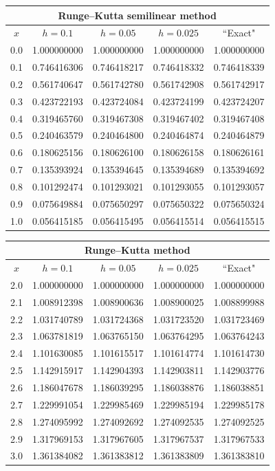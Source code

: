 \documentclass[dvips]{book}
\renewcommand{\exer}[1]{\par\medskip\;\noindent{\color{red}\bf #1.}}
\numberwithin{example}{section}
\numberwithin{equation}{section}
\numberwithin{theorem}{section}
\numberwithin{table}{section}
\numberwithin{figure}{section}
\begin{document}
{\small
\begin{tabular}{|c|r|r|r|r|}
\hline
\multicolumn{5}{|c|}{
 Runge--Kutta  semilinear method}\\\hline
\multicolumn{1}{|c|}{$x$}&
\multicolumn{1}{|c|}{$h=0.1$}&
\multicolumn{1}{|c|}{$h=0.05$}&
\multicolumn{1}{|c|}{$h=0.025$}&
\multicolumn{1}{|c|}{``Exact"}\\ \hline
0.0 & 1.000000000 & 1.000000000 & 1.000000000 & 1.000000000 \\
0.1 & 0.746416306 & 0.746418217 & 0.746418332 & 0.746418339 \\
0.2 & 0.561740647 & 0.561742780 & 0.561742908 & 0.561742917 \\
0.3 & 0.423722193 & 0.423724084 & 0.423724199 & 0.423724207 \\
0.4 & 0.319465760 & 0.319467308 & 0.319467402 & 0.319467408 \\
0.5 & 0.240463579 & 0.240464800 & 0.240464874 & 0.240464879 \\
0.6 & 0.180625156 & 0.180626100 & 0.180626158 & 0.180626161 \\
0.7 & 0.135393924 & 0.135394645 & 0.135394689 & 0.135394692 \\
0.8 & 0.101292474 & 0.101293021 & 0.101293055 & 0.101293057 \\
0.9 & 0.075649884 & 0.075650297 & 0.075650322 & 0.075650324 \\
1.0 & 0.056415185 & 0.056415495 & 0.056415514 & 0.056415515 \\
\hline
\end{tabular}}


\exer{3.3.22}
{\small
\begin{tabular}{|c|r|r|r|r|}
\hline
\multicolumn{5}{|c|}{Runge--Kutta method}\\\hline
\multicolumn{1}{|c|}{$x$}&
\multicolumn{1}{|c|}{$h=0.1$}&
\multicolumn{1}{|c|}{$h=0.05$}&
\multicolumn{1}{|c|}{$h=0.025$}&
\multicolumn{1}{|c|}{``Exact"}\\ \hline
2.0 & 1.000000000 & 1.000000000 & 1.000000000 & 1.000000000 \\
2.1 & 1.008912398 & 1.008900636 & 1.008900025 & 1.008899988 \\
2.2 & 1.031740789 & 1.031724368 & 1.031723520 & 1.031723469 \\
2.3 & 1.063781819 & 1.063765150 & 1.063764295 & 1.063764243 \\
2.4 & 1.101630085 & 1.101615517 & 1.101614774 & 1.101614730 \\
2.5 & 1.142915917 & 1.142904393 & 1.142903811 & 1.142903776 \\
2.6 & 1.186047678 & 1.186039295 & 1.186038876 & 1.186038851 \\
2.7 & 1.229991054 & 1.229985469 & 1.229985194 & 1.229985178 \\
2.8 & 1.274095992 & 1.274092692 & 1.274092535 & 1.274092525 \\
2.9 & 1.317969153 & 1.317967605 & 1.317967537 & 1.317967533 \\
3.0 & 1.361384082 & 1.361383812 & 1.361383809 & 1.361383810 \\
\hline
\end{tabular}}
\medskip
\end{document}
